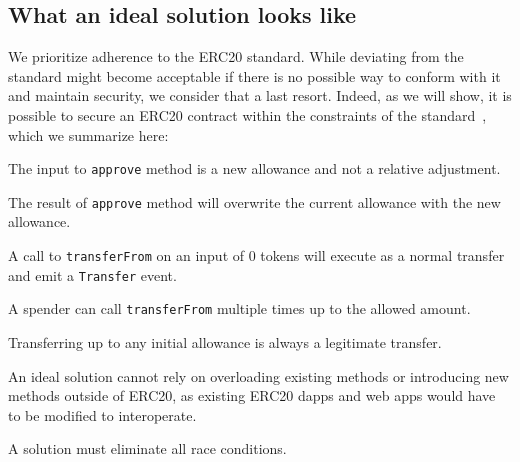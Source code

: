 \subsection{What an ideal solution looks like}\label{sec:criteria}
We prioritize adherence to the ERC20 standard. While deviating from the standard might become acceptable if there is no possible way to conform with it and maintain security, we consider that a last resort. Indeed, as we will show, it is possible to secure an ERC20 contract within the constraints of the standard~\cite{Ref08}, which we summarize here:

\begin{compactlistn}
\item The input to \texttt{approve} method is a new allowance and not a relative adjustment.
\item The result of \texttt{approve} method will overwrite the current allowance with the new allowance.
\item A call to \texttt{transferFrom} on an input of 0 tokens will execute as a normal transfer and emit a \texttt{Transfer} event.
\item A spender can call \texttt{transferFrom} multiple times up to the allowed amount.
\item Transferring up to any initial allowance is always a legitimate transfer.
\item An ideal solution cannot rely on overloading existing methods or introducing new methods outside of ERC20, as existing ERC20 dapps and web apps would have to be modified to interoperate.
\item A solution must eliminate all race conditions.
\end{compactlistn}